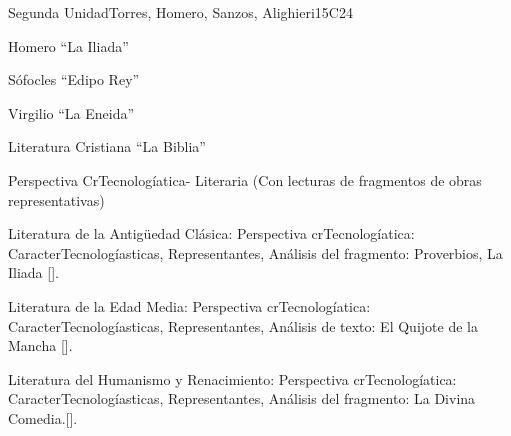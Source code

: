 \begin{syllabus}
\begin{unit}{}{Segunda Unidad}{Torres, Homero, Sanzos, Alighieri}{15}{C24}
\begin{topics}
	\item Homero ``La Iliada''
	\item Sófocles ``Edipo Rey''
	\item Virgilio ``La Eneida''
	\item Literatura Cristiana ``La Biblia''
\end{topics}
\begin{learningoutcomes}
	\item Perspectiva CrTecnologíatica- Literaria (Con lecturas de fragmentos de obras representativas)
	\item Literatura de la Antigüedad Clásica: Perspectiva crTecnologíatica: CaracterTecnologíasticas, Representantes, Análisis del fragmento: Proverbios, La Iliada [\Usage].
	\item Literatura de la Edad Media: Perspectiva crTecnologíatica: CaracterTecnologíasticas, Representantes, Análisis de texto: El Quijote de la Mancha [\Usage].
	\item Literatura del Humanismo y Renacimiento: Perspectiva crTecnologíatica: CaracterTecnologíasticas, Representantes, Análisis del fragmento: La Divina Comedia.[\Usage].
\end{learningoutcomes}
\end{unit}


\end{syllabus}
